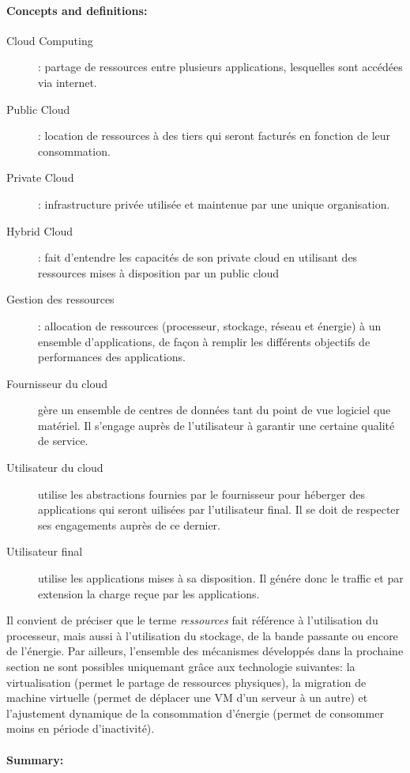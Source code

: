 \documentclass[11pt]{article}
\begin{document}
\paragraph{Concepts and definitions:}
\begin{description}
	\item[Cloud Computing] : partage de ressources entre plusieurs applications, lesquelles sont accédées via internet.
	\item[Public Cloud] : location de ressources à des tiers qui seront facturés en fonction de leur consommation.
	\item[Private Cloud] : infrastructure privée utilisée et maintenue par une unique organisation.
	\item[Hybrid Cloud] : fait d'entendre les capacités de son private cloud en utilisant des ressources mises à disposition par un public cloud
	\item[Gestion des ressources] : allocation de ressources (processeur, stockage, réseau et énergie) à un ensemble d'applications, de façon à remplir les différents 
		objectifs de performances des applications.
	\item[Fournisseur du cloud] gère un ensemble de centres de données tant du point de vue logiciel que matériel. Il s'engage auprès de l'utilisateur à garantir une
		certaine qualité de service.
	\item[Utilisateur du cloud] utilise les abstractions fournies par le fournisseur pour héberger des applications qui seront uilisées par l'utilisateur final. Il 
		se doit de respecter ses engagements auprès de ce dernier.
	\item[Utilisateur final] utilise les applications mises à sa disposition. Il génére donc le traffic et par extension la charge reçue par les applications.
\end{description}
Il convient de préciser que le terme \textit{ressources} fait référence à l'utilisation du processeur, mais aussi à l'utilisation du stockage, de la bande passante ou
encore de l'énergie. Par ailleurs, l'ensemble des mécanismes développés dans la prochaine section ne sont possibles uniquemant grâce aux technologie suivantes: 
la virtualisation (permet le partage de ressources physiques), la migration de machine virtuelle (permet de déplacer une VM d'un serveur à un autre) et l'ajustement 
dynamique de la consommation d'énergie (permet de consommer moins en période d'inactivité).
\paragraph{Summary:}
\end{document}
